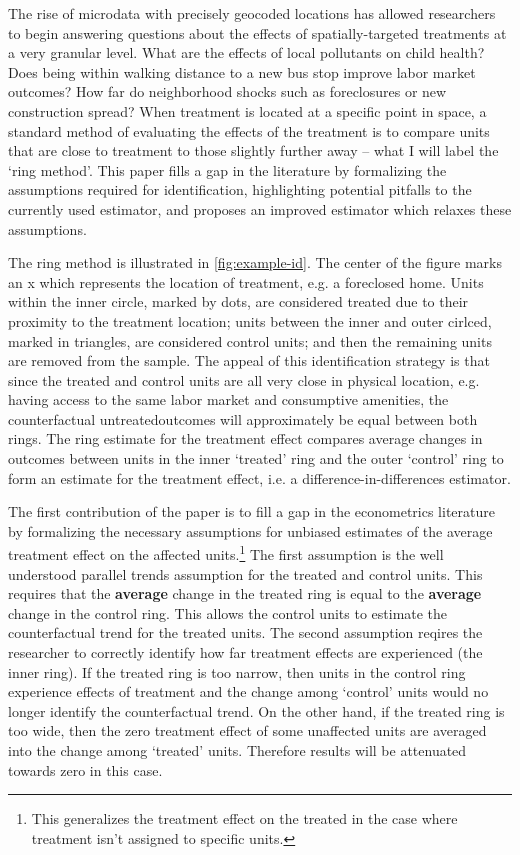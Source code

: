 \documentclass[10pt]{article}
\begin{document}
The rise of microdata with precisely geocoded locations has allowed researchers to begin answering questions about the effects of spatially-targeted treatments at a very granular level. What are the effects of local pollutants on child health? Does being within walking distance to a new bus stop improve labor market outcomes? How far do neighborhood shocks such as foreclosures or new construction spread? When treatment is located at a specific point in space, a standard method of evaluating the effects of the treatment is to compare units that are close to treatment to those slightly further away -- what I will label the `ring method'. This paper fills a gap in the literature by formalizing the assumptions required for identification, highlighting potential pitfalls to the currently used estimator, and proposes an improved estimator which relaxes these assumptions. 

The ring method is illustrated in \autoref{fig:example-id}. The center of the figure marks an x which represents the location of treatment, e.g. a foreclosed home. Units within the inner circle, marked by dots, are considered treated due to their proximity to the treatment location; units between the inner and outer cirlced, marked in triangles, are considered control units; and then the remaining units are removed from the sample. The appeal of this identification strategy is that since the treated and control units are all very close in physical location, e.g. having access to the same labor market and consumptive amenities, the counterfactual untreatedoutcomes will approximately be equal between both rings. The ring estimate for the treatment effect compares average changes in outcomes between units in the inner `treated' ring and the outer `control' ring to form an estimate for the treatment effect, i.e. a difference-in-differences estimator. 

The first contribution of the paper is to fill a gap in the econometrics literature by formalizing the necessary assumptions for unbiased estimates of the average treatment effect on the affected units.\footnote{This generalizes the treatment effect on the treated in the case where treatment isn't assigned to specific units.} The first assumption is the well understood parallel trends assumption for the treated and control units. This requires that the \textbf{average} change in the treated ring is equal to the \textbf{average} change in the control ring. This allows the control units to estimate the counterfactual trend for the treated units. The second assumption reqires the researcher to correctly identify how far treatment effects are experienced (the inner ring). If the treated ring is too narrow, then units in the control ring experience effects of treatment and the change among `control' units would no longer identify the counterfactual trend. On the other hand, if the treated ring is too wide, then the zero treatment effect of some unaffected units are averaged into the change among `treated' units. Therefore results will be attenuated towards zero in this case.
\end{document}
